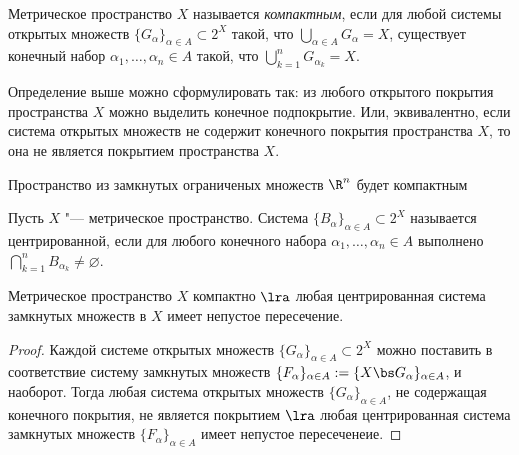 \begin{definition}
    Метрическое пространство $X$ называется \textit{компактным},
    если для любой системы открытых множеств
    $\{G_\alpha\}_{\alpha \in A} \subset 2^X$ такой,
    что $\bigcup\limits_{\alpha \in A} G_\alpha = X$,
    существует конечный набор $\alpha_1, \dotsc, \alpha_n \in A$ такой,
    что $\bigcup\limits_{k = 1}^n G_{\alpha_k} = X$.
\end{definition}

\begin{note}
    Определение выше можно сформулировать так: из любого открытого покрытия пространства $X$ можно выделить конечное подпокрытие. Или, эквивалентно, если система открытых множеств не содержит конечного покрытия пространства $X$, то она не является покрытием пространства $X$.
\end{note}

\begin{example}
    Пространство из замкнутых ограниченых множеств $\R^n$ будет компактным
\end{example}

\begin{definition}\label{center-system}
    Пусть $X$ "--- метрическое пространство. Система $\{B_\alpha\}_{\alpha \in A} \subset 2^X$ называется центрированной, если для любого конечного набора $\alpha_1, \dotsc, \alpha_n \in A$ выполнено $\bigcap\limits_{k = 1}^n B_{\alpha_k} \neq \varnothing$.
\end{definition}

\begin{theorem}\label{thm3.1}
    Метрическое пространство $X$ компактно $\lra$ любая центрированная система замкнутых множеств в $X$ имеет непустое пересечение.
\end{theorem}

\begin{proof}
    Каждой системе открытых множеств $\{G_\alpha\}_{\alpha \in A} \subset 2^X$ можно поставить в соответствие систему замкнутых множеств $\{F_\alpha\}_{\alpha \in A} := \{X \bs G_\alpha\}_{\alpha \in A}$, и наоборот. Тогда любая система открытых множеств $\{G_\alpha\}_{\alpha \in A}$, не содержащая конечного покрытия, не является покрытием $\lra$ любая центрированная система замкнутых множеств $\{F_{\alpha}\}_{\alpha \in A}$ имеет непустое пересеченеие.
\end{proof}